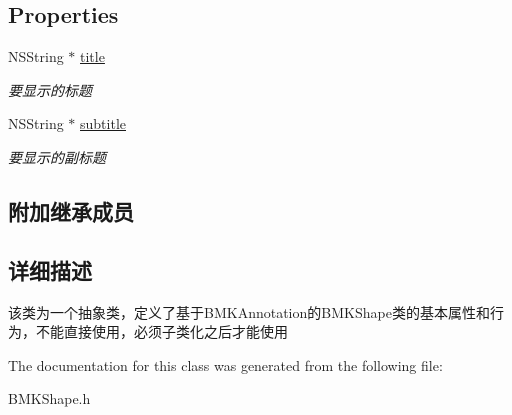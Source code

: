 \subsection*{Properties}
\begin{DoxyCompactItemize}
\item 
\hypertarget{interface_b_m_k_shape_a64da6d2885114c0c2da35aa1ffec925d}{N\-S\-String $\ast$ \hyperlink{interface_b_m_k_shape_a64da6d2885114c0c2da35aa1ffec925d}{title}}\label{interface_b_m_k_shape_a64da6d2885114c0c2da35aa1ffec925d}

\begin{DoxyCompactList}\small\item\em 要显示的标题 \end{DoxyCompactList}\item 
\hypertarget{interface_b_m_k_shape_ae588ba39a27b52bcaed14d40e6494398}{N\-S\-String $\ast$ \hyperlink{interface_b_m_k_shape_ae588ba39a27b52bcaed14d40e6494398}{subtitle}}\label{interface_b_m_k_shape_ae588ba39a27b52bcaed14d40e6494398}

\begin{DoxyCompactList}\small\item\em 要显示的副标题 \end{DoxyCompactList}\end{DoxyCompactItemize}
\subsection*{附加继承成员}


\subsection{详细描述}
该类为一个抽象类，定义了基于\-B\-M\-K\-Annotation的\-B\-M\-K\-Shape类的基本属性和行为，不能直接使用，必须子类化之后才能使用 

The documentation for this class was generated from the following file\-:\begin{DoxyCompactItemize}
\item 
B\-M\-K\-Shape.\-h\end{DoxyCompactItemize}
